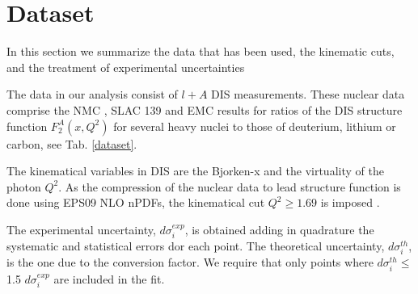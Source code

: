 
\section{Dataset}

In this section we summarize the data that has been used, the
kinematic cuts, and the treatment of experimental
uncertainties

The data in our analysis consist of $\mathit{l} + \mathit{A}$ DIS measurements. These nuclear data comprise the NMC \cite{Amaudruz:1995tq,Arneodo:1995cs,Arneodo:1996rv,Arneodo:1996ru}, SLAC 139 \cite{PhysRevD.49.4348} and EMC \cite{Ashman:1992kv} results for ratios of the DIS structure function $F_2^{A}(x,Q^2)$ for several heavy nuclei to those of deuterium, lithium or carbon, see  Tab. \ref{dataset}.

The kinematical variables in DIS are the Bjorken-x and the virtuality of the photon $Q^2$. As the compression of the nuclear data to lead structure function is done using EPS09 NLO nPDFs, the kinematical cut $Q^2 \ge 1.69$  is imposed \cite{Eskola:2009uj}.

The experimental uncertainty, $d\sigma_i^{exp}$, is obtained adding in quadrature the systematic and statistical errors dor each point. The theoretical uncertainty, $d\sigma_i^{th}$, is the one due to the conversion factor. We require that only points where $d\sigma^{th}_i \le$ 1.5 $d\sigma^{exp}_i$ are included in the fit.

